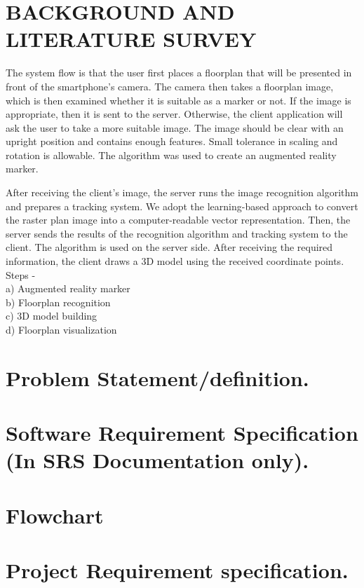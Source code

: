 \documentclass[12pt]{article}
\begin{document}
\section{\large{BACKGROUND AND LITERATURE SURVEY}}
The system flow is that the user first places a floorplan that will be presented in front of the smartphone’s camera. The camera then takes a floorplan image, which is then examined whether it is suitable as a marker or not. If the image is appropriate, then it is sent to the server. Otherwise, the client application will ask the user to take a more suitable image. The image should be clear with an upright position and contains enough features. Small tolerance in scaling and rotation is allowable. The algorithm was used to create an augmented reality marker.

After receiving the client’s image, the server runs the image recognition algorithm and prepares a tracking system. We adopt the learning-based approach to convert the raster plan image into a computer-readable vector representation. Then, the server sends the results of the recognition algorithm and tracking system to the client. The algorithm is used on the server side. After receiving the required information, the client draws a 3D model using the received coordinate points.\\
Steps - \\
a) Augmented reality marker\\
b) Floorplan recognition\\
c) 3D model building\\
d) Floorplan visualization\\

\section{\large{Problem Statement/definition.}}

\section{\large{Software Requirement Specification (In SRS Documentation only).}}

\section{\large{Flowchart}}

\section{\large{Project Requirement specification.}}
\end{document}
